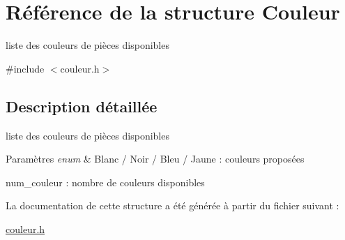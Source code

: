 \hypertarget{struct_couleur}{\section{Référence de la structure Couleur}
\label{struct_couleur}
}


liste des couleurs de pièces disponibles  




{\ttfamily \#include $<$couleur.\-h$>$}



\subsection{Description détaillée}
liste des couleurs de pièces disponibles 


\begin{DoxyParams}{Paramètres}
{\em enum} & Blanc / Noir / Bleu / Jaune \-: couleurs proposées \par
 num\-\_\-couleur \-: nombre de couleurs disponibles \\
\hline
\end{DoxyParams}


La documentation de cette structure a été générée à partir du fichier suivant \-:\begin{DoxyCompactItemize}
\item 
\hyperlink{couleur_8h}{couleur.\-h}\end{DoxyCompactItemize}
